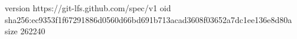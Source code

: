 version https://git-lfs.github.com/spec/v1
oid sha256:ec9353f1f67291886d0560d66bd691b713acad3608f03652a7dc1ee136e8d80a
size 262240
